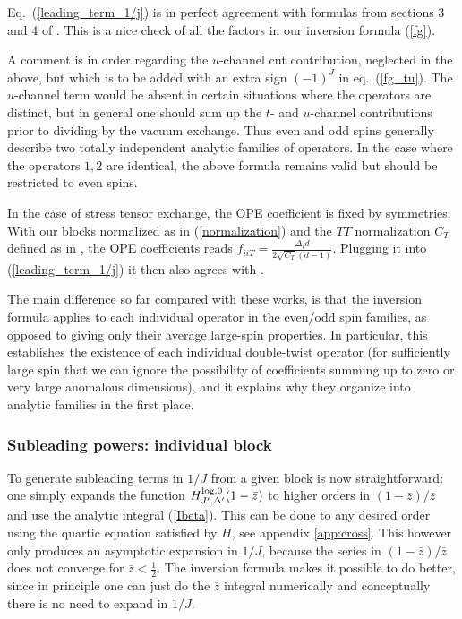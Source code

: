 \documentclass[11pt, reqno,preprint]{article}
\def\slog{{\rm log}}
\def\zbar{\bar{z}}
\def\j{J}
\begin{document}
Eq.~(\ref{leading_term_1/j}) is in perfect agreement with formulas from sections 3 and 4 of \cite{Komargodski:2012ek}.
This is a nice check of all the factors in our inversion formula (\ref{fg}).

A comment is in order regarding the $u$-channel cut contribution, neglected in the above,
but which is to be added with an extra sign $(-1)^\j$ in eq.~(\ref{fg_tu}).
The $u$-channel term would be absent in certain situations where
the operators are distinct, but in general
one should sum up the $t$- and $u$-channel contributions prior to dividing by the vacuum exchange.
Thus even and odd spins  generally describe two totally independent analytic families of operators.
In the case where the operators $1,2$ are identical, the above formula remains valid  but should be restricted to even spins.

In the case of stress tensor exchange, the OPE coefficient is fixed by symmetries.
With our blocks normalized as in (\ref{normalization}) and the $TT$ normalization $C_T$ defined as in \cite{ElShowk:2012ht},
the OPE coefficients reads $f_{iiT}= \frac{\Delta_i d}{2\sqrt{C_T}(d-1)}$. Plugging it into (\ref{leading_term_1/j}) it then
also agrees with \cite{Komargodski:2012ek,Fitzpatrick:2012yx}.

The main difference so far compared with these works,
is that the inversion formula applies to each individual operator in the even/odd spin families, as opposed to giving
only their average large-spin properties.
In particular, this establishes the existence of each individual double-twist operator (for sufficiently large spin that we can ignore the possibility of coefficients summing up to zero or very large anomalous dimensions), and it explains why they organize into analytic families in the first place.

\subsubsection{Subleading powers: individual block}

To generate subleading terms in $1/\j$ from a given block is now straightforward: one simply expands the function
$H_{\j',\Delta'}^{\slog,0}(1-\zbar)$ to higher orders in
$(1-\zbar)/\zbar$ and use the analytic integral (\ref{Ibeta}).
This can be done to any desired order using the quartic equation satisfied by $H$, see appendix \ref{app:cross}.
This however only produces an asymptotic expansion in $1/\j$, because the series in $(1-\zbar)/\zbar$ does not converge for $\zbar<\frac12$.  The inversion formula makes it possible to do better, since in principle one can just do the $\zbar$ integral numerically and conceptually there is no need to expand in $1/\j$.
\end{document}
